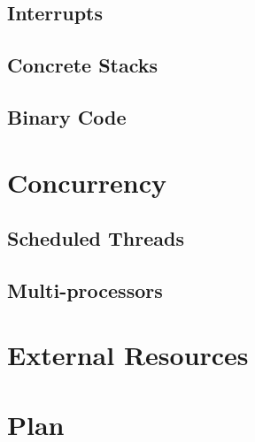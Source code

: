 \documentclass{article}
\begin{document}
\subsection{Interrupts}
\subsection{Concrete Stacks}
\subsection{Binary Code}

\section{Concurrency}
\subsection{Scheduled Threads}
\subsection{Multi-processors}

\section{External Resources}

\section{Plan}
\end{document}
